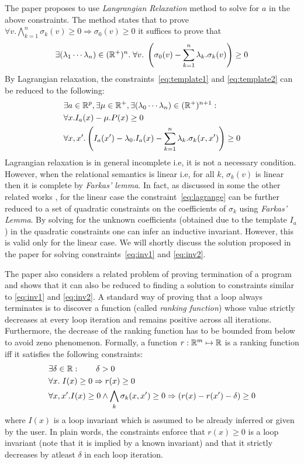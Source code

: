 The paper proposes to use \emph{Langrangian Relaxation} method to solve for $a$ in the above constraints. The method states that to prove 
$\forall v. \bigwedge \limits_{k=1}^{n} \sigma_k(v) \ge 0 \Rightarrow \sigma_0(v) \ge 0$ it suffices to prove that 
%
\begin{align}
\exists (\lambda_1 \cdots \lambda_n) \in (\real^+)^n. \; \forall v. \; \left( \sigma_0(v) -
\sum \limits_{k=1}^{n} \lambda_k. \sigma_k(v) \right) \ge 0 \label{eq:lagrange}
\end{align}
%
By Lagrangian relaxation, the constraints~\ref{eq:template1} and \ref{eq:template2}
can be reduced to the following:
%
\begin{align}
& \nonumber \exists a \in \real^p, \exists \mu \in \real^+, \exists (\lambda_0 \cdots \lambda_n) \in (\real^+)^{n+1}  : \\
&\forall x. I_a(x) - \mu.P(x)  \ge 0  \label{eq:inv1}\\
&\forall x,x'. \left( I_a(x') - \lambda_0.I_a(x) - \sum \limits_{k=1}^{n} \lambda_k. \sigma_k(x,x') \right)  \ge 0 \label{eq:inv2}
\end{align}
%
Lagrangian relaxation is in general incomplete i.e, it is not a necessary condition.
However, when the relational semantics is linear i.e, for all $k$, 
$\sigma_k(v)$ is linear then it is complete by \emph{Farkas' lemma}.
In fact, as discussed in some the other related works \cite{ssriram:CAV03,ssriram:SAS04}, for the linear case the constraint~\ref{eq:lagrange} 
can be further reduced to a set of quadratic constraints on the 
coefficients of $\sigma_k$ using \emph{Farkas' Lemma}. 
By solving for the unknown coefficients (obtained due to the template $I_a$) in the
quadratic constraints one can infer an inductive invariant.
However, this is valid only for the linear case. We will shortly discuss
the solution proposed in the paper for solving constraints~\ref{eq:inv1} and \ref{eq:inv2}.

The paper also considers a related problem of proving termination of a program
and shows that it can also be reduced to finding a solution to constraints 
similar to \ref{eq:inv1} and \ref{eq:inv2}. A standard way of proving that 
a loop always terminates is to discover a function (called \emph{ranking function}) whose value strictly decreases at every loop iteration and remains positive across all iterations.
Furthermore, the decrease of the ranking function has to be bounded from below to avoid zeno phenomenon.
Formally, a function $r: \mathbb{R}^m \mapsto \mathbb{R}$ is a ranking function 
iff it satisfies the following constraints:
%
\begin{align*}
& \exists \delta \in \mathbb{R}:  \qquad \delta > 0 \\
& \forall x. \; I(x) \ge 0 \Rightarrow r(x) \ge 0 \\
& \forall x,x'. I(x) \ge 0  \wedge \bigwedge_k \sigma_k(x,x') \ge 0 \Rightarrow  
(r(x) - r(x') - \delta) \ge 0
\end{align*}
%
where $I(x)$ is a loop invariant which is assumed to be already inferred 
or given by the user. 
In plain words, the constraints enforce that $r(x) \ge 0$ is a loop invariant 
(note that it is implied by a known invariant) and that it strictly decreases by atleast $\delta$ in each loop iteration.

